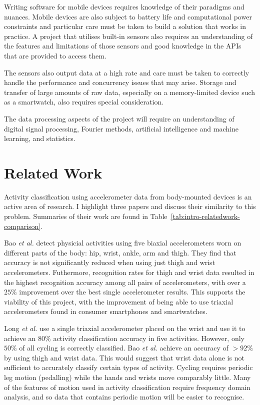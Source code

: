     Writing software for mobile devices requires knowledge of their paradigms and nuances.
    Mobile devices are also subject to battery life and computational power constraints and   
    particular care must be taken to build a solution that works in practice.  
    A project that utilises built-in sensors also requires an understanding of the features and 
    limitations of those sensors and good knowledge in the APIs that are provided to access them.

    The sensors also output data at a high rate and care must be taken to correctly handle the
    performance and concurrency issues that may arise. Storage and transfer of large amounts of
    raw data, especially on a memory-limited device such as a smartwatch, also requires special
    consideration. 
    
    The data processing aspects of the project will require an understanding of digital signal 
    processing, Fourier methods, artificial intelligence and machine learning, and statistics.
  
  \section{Related Work}
  \label{sec:intro-relatedwork}
    Activity classification using accelerometer data from body-mounted devices is an active area of
    research. I highlight three papers and discuss their similarity to this problem. Summaries of
    their work are found in Table~\ref{tab:intro-relatedwork-comparison}.

    Bao \emph{et al.} \cite{bao2004activity} detect physicial activities using five biaxial accelerometers
    worn on different parts of the body: hip, wrist, ankle, arm and thigh. They find that accuracy  
    is not significantly reduced when using just thigh and wrist accelerometers. Futhermore,
    recognition rates for thigh and wrist data resulted in the highest recognition accuracy among
    all pairs of accelerometers, with over a $25\%$ improvement over the best single accelerometer
    results. This supports the viability of this project, with the improvement of being able to use 
    triaxial accelerometers found in consumer smartphones and smartwatches.
    
    Long \emph{et al.} \cite{long2009single} use a single triaxial accelerometer placed on the wrist and use it to achieve an $80\%$ activity classification accuracy in five activities. However, only $50\%$ of all cycling is correctly classified. Bao \emph{et al.} achieve an accuracy of $>92\%$ by using thigh and wrist data. This would suggest that wrist data alone is not sufficient to accurately classify certain types of activity. Cycling requires periodic leg motion (pedalling) while the hands and wrists move comparably little. Many of the features of motion used in activity classification require frequency domain analysis, and so data that contains periodic motion will be easier to recognise.
    
